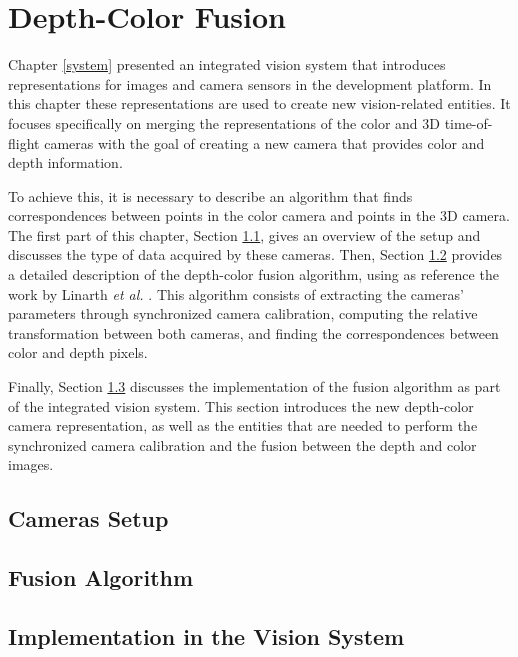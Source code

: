 \chapter{Depth-Color Fusion} \label{depthcolor}

Chapter \ref{system} presented an integrated vision system that introduces representations for images and 
camera sensors in the \RD{} development platform. In this chapter these representations are used to create
new vision-related entities. It focuses specifically on merging the representations of the color and 3D 
time-of-flight cameras with the goal of creating a new camera that provides color and depth information. 

To achieve this, it is necessary to describe an algorithm that finds correspondences between points in the 
color camera and points in the 3D camera. The first part of this chapter, Section \ref{cameras}, gives an 
overview of the setup and discusses the type of data acquired by these cameras. Then, Section \ref{algorithm} 
provides a detailed description of the depth-color fusion algorithm, using as reference the work by Linarth 
\textit{et al.} \cite{Linarth}. This algorithm consists of extracting the cameras' parameters through synchronized 
camera calibration, computing the relative transformation between both cameras, and finding the 
correspondences between color and depth pixels.

Finally, Section \ref{implementation} discusses the implementation of the fusion algorithm as part of the 
integrated vision system. This section introduces the new depth-color camera representation, as well as the
entities that are needed to perform the synchronized camera calibration and the fusion between the depth 
and color images.


\section{Cameras Setup} \label{cameras}


\section{Fusion Algorithm} \label{algorithm}


\section{Implementation in the Vision System} \label{implementation}
	
